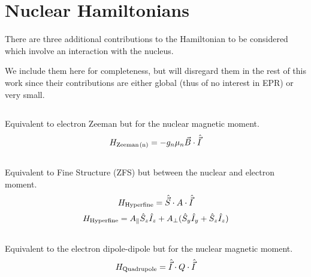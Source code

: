 \section{Nuclear Hamiltonians}\label{nuclear}
There are three additional contributions to the Hamiltonian to be considered which involve an interaction with the nucleus. 

We include them here for completeness, but will disregard them in the rest of this work since their contributions are either global (thus of no interest in EPR) or very small. 
\subsection{}
Equivalent to electron Zeeman but for the nuclear magnetic moment. 
\begin{equation}
    H_{\ce{Zeeman(n)}} = -g_n \mu_n \vec{B} \cdot \hat{\vec{I}}
    \label{eq:nuclear_zeeman_hamiltonian}
\end{equation}

\subsection{}
Equivalent to Fine Structure (ZFS) but between the nuclear and electron moment. 
\begin{equation}
    H_{\ce{Hyperfine}} = \hat{\vec{S}} \cdot A \cdot \hat{\vec{I}}
    \label{eq:hyperfine_hamiltonian_dense}
\end{equation}
\begin{equation}
    H_{\ce{Hyperfine}} = A_\parallel \hat{S}_z\hat{I}_z + A_\perp(\hat{S}_y\hat{I}_y + \hat{S}_z\hat{I}_z)
    \label{eq:hyperfine_hamiltonian_componentwise}
\end{equation}

\subsection{}
Equivalent to the electron dipole-dipole but for the nuclear magnetic moment. 
\begin{equation}
    H_{\ce{Quadrupole}} = \hat{\vec{I}} \cdot Q \cdot \hat{\vec{I}}
    \label{eq:nuclear_quadrupole}
\end{equation}
